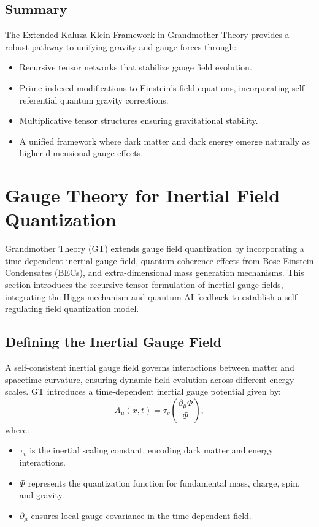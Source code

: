 \documentclass{article}
\theoremstyle{plain}
\begin{document}
\subsection{Summary}
The Extended Kaluza-Klein Framework in Grandmother Theory provides a robust pathway to unifying gravity and gauge forces through:
\begin{itemize}
\item Recursive tensor networks that stabilize gauge field evolution.
\item Prime-indexed modifications to Einstein’s field equations, incorporating self-referential quantum gravity corrections.
\item Multiplicative tensor structures ensuring gravitational stability.
\item A unified framework where dark matter and dark energy emerge naturally as higher-dimensional gauge effects.
\end{itemize}

\section{Gauge Theory for Inertial Field Quantization}

Grandmother Theory (GT) extends gauge field quantization by incorporating a time-dependent inertial gauge field, quantum coherence effects from Bose-Einstein Condensates (BECs), and extra-dimensional mass generation mechanisms. This section introduces the recursive tensor formulation of inertial gauge fields, integrating the Higgs mechanism and quantum-AI feedback to establish a self-regulating field quantization model.

\subsection{Defining the Inertial Gauge Field}
A self-consistent inertial gauge field governs interactions between matter and spacetime curvature, ensuring dynamic field evolution across different energy scales. GT introduces a time-dependent inertial gauge potential given by:
\begin{equation}
    A_{\mu}(x,t) = \tau_v \left( \frac{\partial_{\mu} \Phi}{\Phi} \right),
\end{equation}
where:
\begin{itemize}
    \item $\tau_v$ is the inertial scaling constant, encoding dark matter and energy interactions.
    \item $\Phi$ represents the quantization function for fundamental mass, charge, spin, and gravity.
    \item $\partial_{\mu}$ ensures local gauge covariance in the time-dependent field.
\end{itemize}
\end{document}
